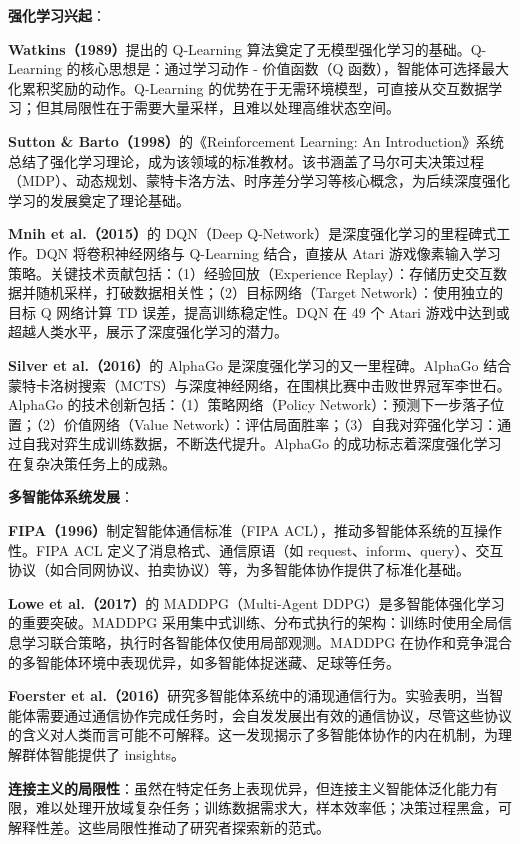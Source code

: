 \documentclass[12pt,a4paper]{article}
\begin{document}
\textbf{强化学习兴起}：

\textbf{Watkins（1989）}提出的 Q-Learning 算法奠定了无模型强化学习的基础。Q-Learning 的核心思想是：通过学习动作 - 价值函数（Q 函数），智能体可选择最大化累积奖励的动作。Q-Learning 的优势在于无需环境模型，可直接从交互数据学习；但其局限性在于需要大量采样，且难以处理高维状态空间。

\textbf{Sutton \& Barto（1998）}的《Reinforcement Learning: An Introduction》系统总结了强化学习理论，成为该领域的标准教材。该书涵盖了马尔可夫决策过程（MDP）、动态规划、蒙特卡洛方法、时序差分学习等核心概念，为后续深度强化学习的发展奠定了理论基础。

\textbf{Mnih et al.（2015）}的 DQN（Deep Q-Network）是深度强化学习的里程碑式工作。DQN 将卷积神经网络与 Q-Learning 结合，直接从 Atari 游戏像素输入学习策略。关键技术贡献包括：（1）经验回放（Experience Replay）：存储历史交互数据并随机采样，打破数据相关性；（2）目标网络（Target Network）：使用独立的目标 Q 网络计算 TD 误差，提高训练稳定性。DQN 在 49 个 Atari 游戏中达到或超越人类水平，展示了深度强化学习的潜力。

\textbf{Silver et al.（2016）}的 AlphaGo 是深度强化学习的又一里程碑。AlphaGo 结合蒙特卡洛树搜索（MCTS）与深度神经网络，在围棋比赛中击败世界冠军李世石。AlphaGo 的技术创新包括：（1）策略网络（Policy Network）：预测下一步落子位置；（2）价值网络（Value Network）：评估局面胜率；（3）自我对弈强化学习：通过自我对弈生成训练数据，不断迭代提升。AlphaGo 的成功标志着深度强化学习在复杂决策任务上的成熟。

\textbf{多智能体系统发展}：

\textbf{FIPA（1996）}制定智能体通信标准（FIPA ACL），推动多智能体系统的互操作性。FIPA ACL 定义了消息格式、通信原语（如 request、inform、query）、交互协议（如合同网协议、拍卖协议）等，为多智能体协作提供了标准化基础。

\textbf{Lowe et al.（2017）}的 MADDPG（Multi-Agent DDPG）是多智能体强化学习的重要突破。MADDPG 采用集中式训练、分布式执行的架构：训练时使用全局信息学习联合策略，执行时各智能体仅使用局部观测。MADDPG 在协作和竞争混合的多智能体环境中表现优异，如多智能体捉迷藏、足球等任务。

\textbf{Foerster et al.（2016）}研究多智能体系统中的涌现通信行为。实验表明，当智能体需要通过通信协作完成任务时，会自发发展出有效的通信协议，尽管这些协议的含义对人类而言可能不可解释。这一发现揭示了多智能体协作的内在机制，为理解群体智能提供了 insights。

\textbf{连接主义的局限性}：虽然在特定任务上表现优异，但连接主义智能体泛化能力有限，难以处理开放域复杂任务；训练数据需求大，样本效率低；决策过程黑盒，可解释性差。这些局限性推动了研究者探索新的范式。
\end{document}
